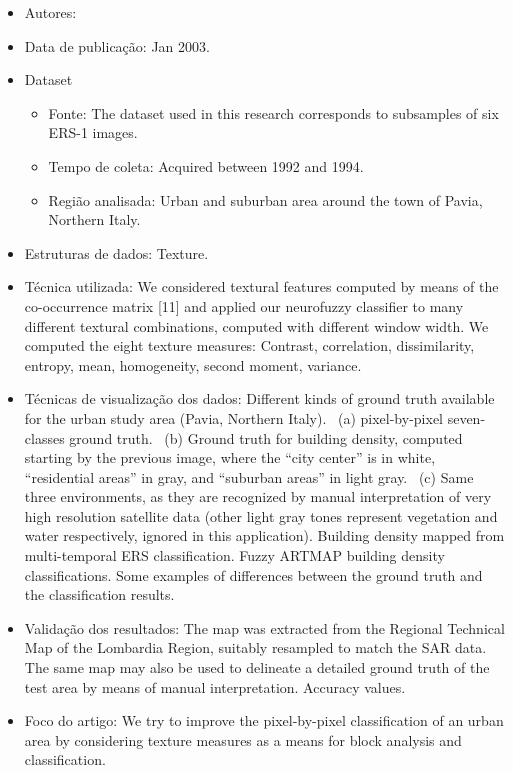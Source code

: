 \documentclass[paper=a4, fontsize=11pt]{scrartcl}
\begin{document}
\begin{itemize}
    \item Autores:~\cite{dell2003texture}
    \item Data de publicação: Jan 2003.
    \item Dataset
    \begin{itemize}
        \item Fonte: The dataset used in this research corresponds to subsamples of six ERS-1 images.
        \item Tempo de coleta: Acquired between 1992 and 1994.
        \item Região analisada: Urban and suburban area around the town of Pavia, Northern Italy.
    \end{itemize}
    \item Estruturas de dados: Texture.
    \item Técnica utilizada: We considered textural features computed by means of the co-occurrence matrix [11] and applied our neurofuzzy classifier to many different textural combinations, computed with different window width. We computed the eight texture measures: Contrast, correlation, dissimilarity, entropy, mean, homogeneity, second moment, variance.
    \item Técnicas de visualização dos dados: Different kinds of ground truth available for the urban study area (Pavia, Northern Italy). 
    ~(a) pixel-by-pixel seven-classes ground truth. 
    ~(b) Ground truth for building density, computed starting by the previous image, where the “city center” is in white, “residential areas” in gray, and “suburban areas” in light gray. 
    ~(c) Same three environments, as they are recognized by manual interpretation of very high resolution satellite data (other light gray tones represent vegetation and water respectively, ignored in this application).
    Building density mapped from multi-temporal ERS classification.
    Fuzzy ARTMAP building density classifications.
    Some examples of differences between the ground truth and the classification results.
    \item Validação dos resultados: The map was extracted from the Regional Technical Map of the Lombardia Region, suitably resampled to match the SAR data. The same map may also be used to delineate a detailed ground truth of the test area by means of manual interpretation. Accuracy values.
    \item Foco do artigo: We try to improve the pixel-by-pixel classification of an urban area by considering texture measures as a means for block analysis and classification. 
\end{itemize}
\end{document}
